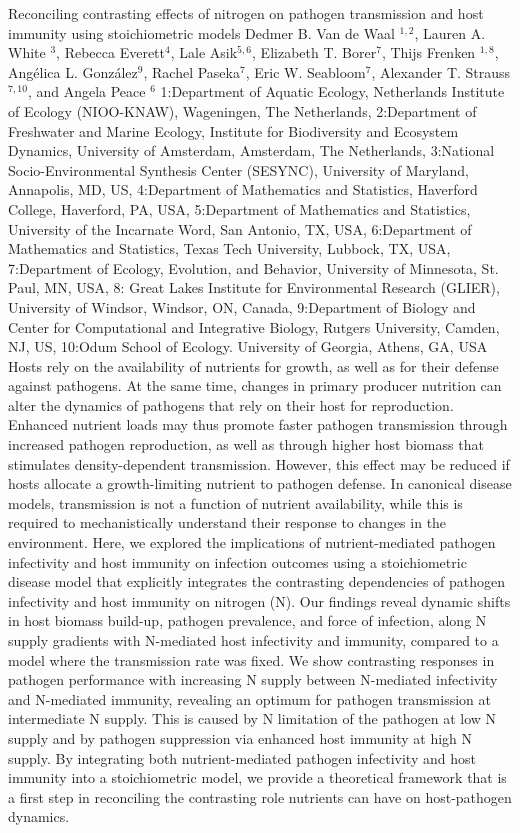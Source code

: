 \vspace{1.5ex}
\abs
{Reconciling contrasting effects of nitrogen on pathogen transmission and host immunity using stoichiometric models }
{ Dedmer B. Van de Waal $^{1,2}$, Lauren A. White $^{3}$, Rebecca Everett$^{4}$, Lale Asik$^{5,6}$, Elizabeth T. Borer$^{7}$, Thijs Frenken $^{1,8}$, Angélica L. González$^{9}$, Rachel Paseka$^{7}$, Eric W. Seabloom$^{7}$, Alexander T. Strauss $^{7,10}$, and Angela Peace $^{6}$}
{1:Department of Aquatic Ecology, Netherlands Institute of Ecology (NIOO-KNAW), Wageningen, The Netherlands, 2:Department of Freshwater and Marine Ecology, Institute for Biodiversity and Ecosystem Dynamics, University of Amsterdam, Amsterdam, The Netherlands, 3:National Socio-Environmental Synthesis Center (SESYNC), University of Maryland, Annapolis, MD, US, 4:Department of Mathematics and Statistics, Haverford College, Haverford, PA, USA, 5:Department of Mathematics and Statistics, University of the Incarnate Word, San Antonio, TX, USA, 6:Department of Mathematics and Statistics, Texas Tech University, Lubbock, TX, USA, 7:Department of Ecology, Evolution, and Behavior, University of Minnesota, St. Paul, MN, USA, 8: Great Lakes Institute for Environmental Research (GLIER), University of Windsor, Windsor, ON, Canada, 9:Department of Biology and Center for Computational and Integrative Biology, Rutgers University, Camden, NJ, US, 10:Odum School of Ecology. University of Georgia, Athens, GA, USA}
{Hosts rely on the availability of nutrients for growth, as well as for their defense against pathogens. At the same time, changes in primary producer nutrition can alter the dynamics of pathogens that rely on their host for reproduction. Enhanced nutrient loads may thus promote faster pathogen transmission through increased pathogen reproduction, as well as through higher host biomass that stimulates density-dependent transmission. However, this effect may be reduced if hosts allocate a growth-limiting nutrient to pathogen defense. In canonical disease models, transmission is not a function of nutrient availability, while this is required to mechanistically understand their response to changes in the environment. Here, we explored the implications of nutrient-mediated pathogen infectivity and host immunity on infection outcomes using a stoichiometric disease model that explicitly integrates the contrasting dependencies of pathogen infectivity and host immunity on nitrogen (N). Our findings reveal dynamic shifts in host biomass build-up, pathogen prevalence, and force of infection, along N supply gradients with N-mediated host infectivity and immunity, compared to a model where the transmission rate was fixed. We show contrasting responses in pathogen performance with increasing N supply between N-mediated infectivity and N-mediated immunity, revealing an optimum for pathogen transmission at intermediate N supply. This is caused by N limitation of the pathogen at low N supply and by pathogen suppression via enhanced host immunity at high N supply. By integrating both nutrient-mediated pathogen infectivity and host immunity into a stoichiometric model, we provide a theoretical framework that is a first step in reconciling the contrasting role nutrients can have on host-pathogen dynamics.}


